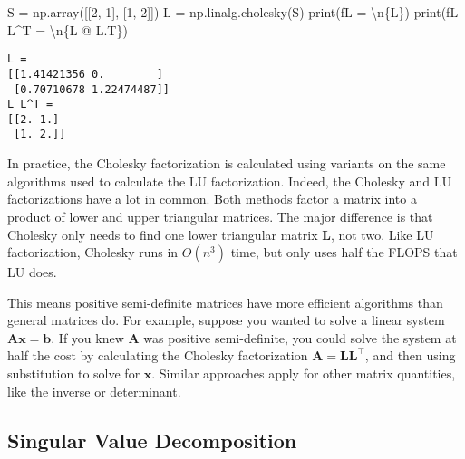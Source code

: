 \documentclass[
  letterpaper,
  DIV=11,
  numbers=noendperiod]{scrreprt}
\newenvironment{Shaded}{\begin{snugshade}}{\end{snugshade}}
\newcommand{\BuiltInTok}[1]{\textcolor[rgb]{0.00,0.23,0.31}{#1}}
\newcommand{\CharTok}[1]{\textcolor[rgb]{0.13,0.47,0.30}{#1}}
\newcommand{\DecValTok}[1]{\textcolor[rgb]{0.68,0.00,0.00}{#1}}
\newcommand{\NormalTok}[1]{\textcolor[rgb]{0.00,0.23,0.31}{#1}}
\newcommand{\OperatorTok}[1]{\textcolor[rgb]{0.37,0.37,0.37}{#1}}
\newcommand{\SpecialCharTok}[1]{\textcolor[rgb]{0.37,0.37,0.37}{#1}}
\newcommand{\SpecialStringTok}[1]{\textcolor[rgb]{0.13,0.47,0.30}{#1}}
\begin{document}
\begin{Shaded}
\begin{Highlighting}[]
\NormalTok{S }\OperatorTok{=}\NormalTok{ np.array([[}\DecValTok{2}\NormalTok{, }\DecValTok{1}\NormalTok{], }
\NormalTok{              [}\DecValTok{1}\NormalTok{, }\DecValTok{2}\NormalTok{]])}
\NormalTok{L }\OperatorTok{=}\NormalTok{ np.linalg.cholesky(S)}
\BuiltInTok{print}\NormalTok{(}\SpecialStringTok{f\textquotesingle{}L = }\CharTok{\textbackslash{}n}\SpecialCharTok{\{}\NormalTok{L}\SpecialCharTok{\}}\SpecialStringTok{\textquotesingle{}}\NormalTok{)}
\BuiltInTok{print}\NormalTok{(}\SpecialStringTok{f\textquotesingle{}L L\^{}T = }\CharTok{\textbackslash{}n}\SpecialCharTok{\{}\NormalTok{L }\OperatorTok{@}\NormalTok{ L}\SpecialCharTok{.}\NormalTok{T}\SpecialCharTok{\}}\SpecialStringTok{\textquotesingle{}}\NormalTok{)}
\end{Highlighting}
\end{Shaded}

\begin{verbatim}
L = 
[[1.41421356 0.        ]
 [0.70710678 1.22474487]]
L L^T = 
[[2. 1.]
 [1. 2.]]
\end{verbatim}

In practice, the Cholesky factorization is calculated using variants on
the same algorithms used to calculate the LU factorization. Indeed, the
Cholesky and LU factorizations have a lot in common. Both methods factor
a matrix into a product of lower and upper triangular matrices. The
major difference is that Cholesky only needs to find one lower
triangular matrix \(\mathbf{L}\), not two. Like LU factorization,
Cholesky runs in \(O(n^3)\) time, but only uses half the FLOPS that LU
does.

This means positive semi-definite matrices have more efficient
algorithms than general matrices do. For example, suppose you wanted to
solve a linear system \(\mathbf{A}\mathbf{x}=\mathbf{b}\). If you knew
\(\mathbf{A}\) was positive semi-definite, you could solve the system at
half the cost by calculating the Cholesky factorization
\(\mathbf{A}=\mathbf{L}\mathbf{L}^\top\), and then using substitution to
solve for \(\mathbf{x}\). Similar approaches apply for other matrix
quantities, like the inverse or determinant.

\hypertarget{singular-value-decomposition}{%
\subsection{Singular Value
Decomposition}\label{singular-value-decomposition}}
\end{document}
